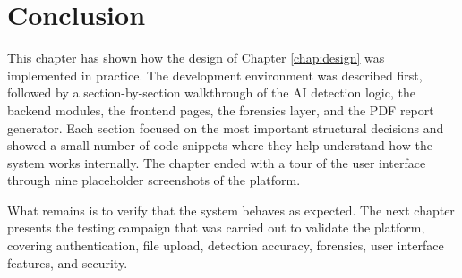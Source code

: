 \section{Conclusion}

This chapter has shown how the design of Chapter \ref{chap:design} was implemented in practice. The development environment was described first, followed by a section-by-section walkthrough of the AI detection logic, the backend modules, the frontend pages, the forensics layer, and the PDF report generator. Each section focused on the most important structural decisions and showed a small number of code snippets where they help understand how the system works internally. The chapter ended with a tour of the user interface through nine placeholder screenshots of the platform.

What remains is to verify that the system behaves as expected. The next chapter presents the testing campaign that was carried out to validate the platform, covering authentication, file upload, detection accuracy, forensics, user interface features, and security.